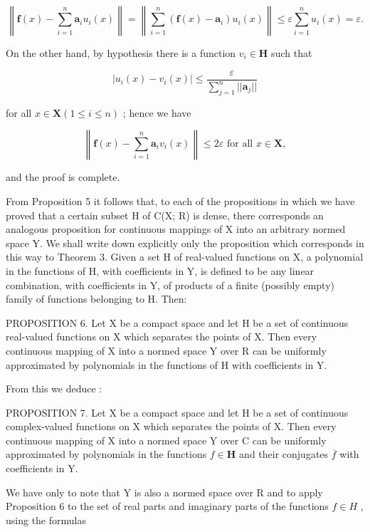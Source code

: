 \[
\left\| \boldsymbol {f} (x) - \sum_ {i = 1} ^ {n} \boldsymbol {a} _ {i} u _ {i} (x) \right\| = \left\| \sum_ {i = 1} ^ {n} (\boldsymbol {f} (x) - \boldsymbol {a} _ {i}) u _ {i} (x) \right\| \leqslant \varepsilon \sum_ {i = 1} ^ {n} u _ {i} (x) = \varepsilon .
\]

On the other hand, by hypothesis there is a function \(v_{i} \in \mathbf{H}\) such that

\[
\left| u _ {i} (x) - v _ {i} (x) \right| \leqslant \frac {\varepsilon}{\sum_ {j = 1} ^ {n} | | \boldsymbol {a} _ {j} | |}
\]

for all \(x \in \mathbf{X} (1 \leqslant i \leqslant n)\) ; hence we have

\[
\left\| \boldsymbol {f} (x) - \sum_ {i = 1} ^ {n} \boldsymbol {a} _ {i} v _ {i} (x) \right\| \leqslant 2 \varepsilon \text {   for   all   } x \in \mathbf {X},
\]

and the proof is complete.

From Proposition 5 it follows that, to each of the propositions in which we have proved that a certain subset H of C(X; R) is dense, there corresponds an analogous proposition for continuous mappings of X into an arbitrary normed space Y. We shall write down explicitly only the proposition which corresponds in this way to Theorem 3. Given a set H of real-valued functions on X, a polynomial in the functions of H, with coefficients in Y, is defined to be any linear combination, with coefficients in Y, of products of a finite (possibly empty) family of functions belonging to H. Then:

PROPOSITION 6. Let X be a compact space and let H be a set of continuous real-valued functions on X which separates the points of X. Then every continuous mapping of X into a normed space Y over R can be uniformly approximated by polynomials in the functions of H with coefficients in Y.

From this we deduce :

PROPOSITION 7. Let X be a compact space and let H be a set of continuous complex-valued functions on X which separates the points of X. Then every continuous mapping of X into a normed space Y over C can be uniformly approximated by polynomials in the functions \(f \in \mathbf{H}\) and their conjugates \(\overline{f}\) with coefficients in Y.

We have only to note that Y is also a normed space over R and to apply Proposition 6 to the set of real parts and imaginary parts of the functions \(f \in H\) , using the formulas

